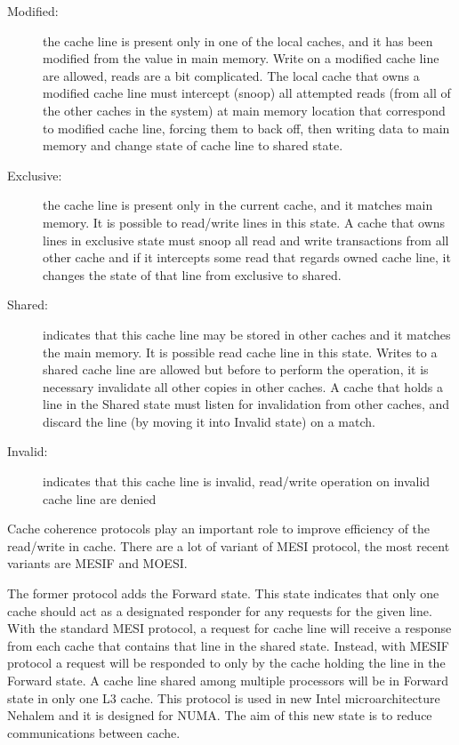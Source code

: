 \begin{description}

\item [Modified:]
the cache line is present only in one of the local caches, and it has been modified from the value in main memory. Write on a modified cache line are 
allowed, reads are a bit complicated. The local cache that owns a modified cache line must intercept (snoop) all attempted reads (from all of the other 
caches in the system) at main memory location that correspond to modified cache line, forcing them to back off, then writing data to main memory and change
state of cache line to shared state.
 
\item [Exclusive:]
the cache line is present only in the current cache, and it matches main memory. It is possible to read/write lines in this state. A cache that owns
lines in exclusive state must snoop all read and write transactions from all other cache and if it intercepts some read that regards owned cache line, 
it changes the state of that line from exclusive to shared. 

\item [Shared:]
indicates that this cache line may be stored in other caches and it matches the main memory. It is possible read cache line in this state. Writes to a 
shared cache line are allowed but before to perform the operation, it is necessary invalidate all other copies in other caches.
A cache that holds a line in the Shared state must listen for invalidation from other caches, and discard the line (by moving it into Invalid state) on a 
match.

\item [Invalid:]
indicates that this cache line is invalid, read/write operation on invalid cache line are denied

\end{description}

Cache coherence protocols play an important role to improve efficiency of the read/write in cache. There are a lot of variant of MESI protocol, the most 
recent variants are MESIF and MOESI.

The former protocol adds the Forward state. This state indicates that only one cache should act as a designated 
responder for any requests for the given line. With the standard MESI protocol, a request for cache line will receive a response from each cache that 
contains that line in the shared state. Instead, with MESIF protocol a request will be responded to only by the cache holding the line in the Forward state.
A cache line shared among multiple processors will be in Forward state in only one L3 cache. This protocol is used in new Intel microarchitecture Nehalem 
and it is designed for NUMA. The aim of this new state is to reduce communications between cache.

